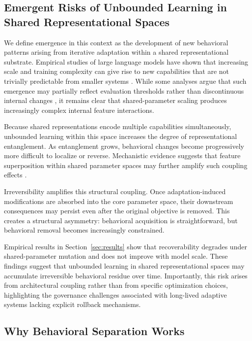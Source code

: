\documentclass[10pt]{article}
\begin{document}
	
	\subsection{Emergent Risks of Unbounded Learning in Shared Representational Spaces}
	\label{sec:analysis_emergence}
	
	We define emergence in this context as the development of new behavioral patterns arising from iterative adaptation within a shared representational substrate. Empirical studies of large language models have shown that increasing scale and training complexity can give rise to new capabilities that are not trivially predictable from smaller systems \cite{wei2022emergent}. While some analyses argue that such emergence may partially reflect evaluation thresholds rather than discontinuous internal changes \cite{schaeffer2023mirage}, it remains clear that shared-parameter scaling produces increasingly complex internal feature interactions.
	
	Because shared representations encode multiple capabilities simultaneously, unbounded learning within this space increases the degree of representational entanglement. As entanglement grows, behavioral changes become progressively more difficult to localize or reverse. Mechanistic evidence suggests that feature superposition within shared parameter spaces may further amplify such coupling effects \cite{elhage2022superposition}.
	
	Irreversibility amplifies this structural coupling. Once adaptation-induced modifications are absorbed into the core parameter space, their downstream consequences may persist even after the original objective is removed. This creates a structural asymmetry: behavioral acquisition is straightforward, but behavioral removal becomes increasingly constrained.
	
	Empirical results in Section~\ref{sec:results} show that recoverability degrades under shared-parameter mutation and does not improve with model scale. These findings suggest that unbounded learning in shared representational spaces may accumulate irreversible behavioral residue over time. Importantly, this risk arises from architectural coupling rather than from specific optimization choices, highlighting the governance challenges associated with long-lived adaptive systems lacking explicit rollback mechanisms.
	
	
	\subsection{Why Behavioral Separation Works}
	\label{sec:analysis_separation}
	
\end{document}

